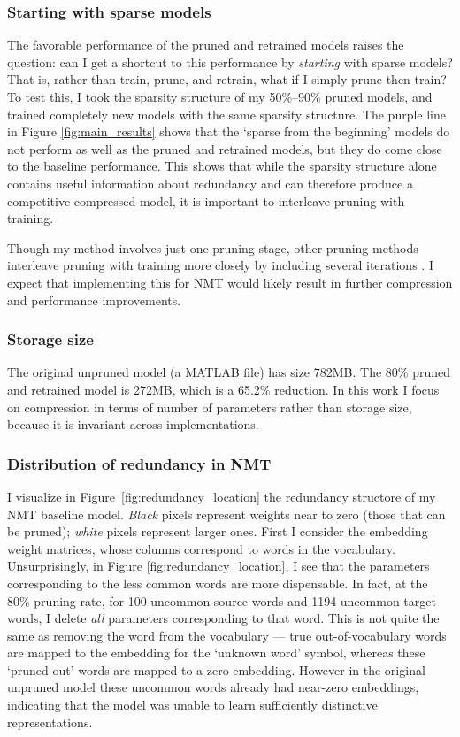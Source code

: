 \subsubsection{Starting with sparse models}
\label{subsec:sparse}
The favorable performance of the pruned and retrained models raises the question: can I get a shortcut to this performance by \emph{starting} with sparse models?
That is, rather than train, prune, and retrain, what if I simply prune then train?
To test this, I took the sparsity structure of my 50\%--90\% pruned models, and trained completely new models with the same sparsity structure.
The purple line in Figure \ref{fig:main_results} shows that the `sparse from the beginning' models do not perform as well as the pruned and retrained models, but they do come close to the baseline performance.
This shows that while the sparsity structure alone contains useful information about redundancy and can therefore produce a competitive compressed model, it is important to interleave pruning with training.

Though my method involves just one pruning stage, other pruning methods interleave pruning with training more closely by including several iterations \cite{collins2014memory,han2015learning}.
I expect that implementing this for NMT would likely result in further compression and performance improvements.



\subsubsection{Storage size}
The original unpruned model (a MATLAB file) has size 782MB.
The 80\% pruned and retrained model is 272MB, which is a 65.2\% reduction.
In this work I focus on compression in terms of number of parameters rather than storage size, because it is invariant across implementations.

\subsubsection{Distribution of redundancy in NMT}
\label{subsubsec:redundancy}

I visualize in Figure~\ref{fig:redundancy_location} the redundancy structore of
my NMT baseline model.
{\it Black} pixels represent weights near to zero (those that can be pruned); {\it white} pixels represent larger ones.
First I consider the embedding weight matrices, whose columns correspond to words in the vocabulary.
Unsurprisingly, in Figure \ref{fig:redundancy_location}, I see that the parameters corresponding to the less common words are more dispensable.
In fact, at the 80\% pruning rate, for 100 uncommon source words and 1194
uncommon target words, I delete \emph{all} parameters corresponding to that word.
This is not quite the same as removing the word from the vocabulary --- true out-of-vocabulary words are mapped to the embedding for the `unknown word' symbol, whereas these `pruned-out' words are mapped to a zero embedding.
However in the original unpruned model these uncommon words already had near-zero embeddings, indicating that the model was unable to learn sufficiently distinctive representations.

